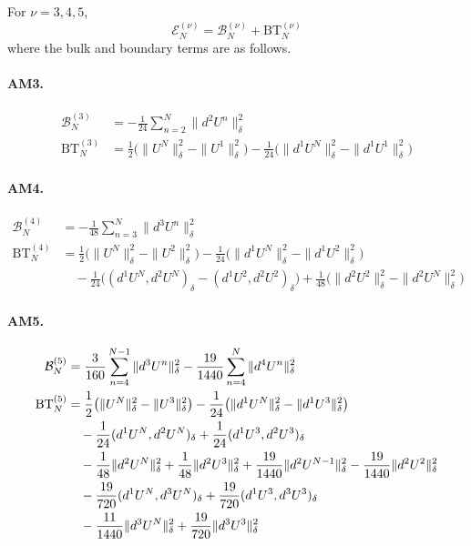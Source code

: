 \documentclass[11pt]{article}
\begin{document}
\begin{lem}
\label{lem:adams-exact-energy-decompositions}
For \(\nu=3,4,5\),
\begin{equation}
\mathcal E_N^{(\nu)}=\mathcal B_N^{(\nu)}+\mathrm{BT}_N^{(\nu)} \label{eq:adams-bulk-boundary-decomposition}
\end{equation}
where the bulk and boundary terms are as follows.

\paragraph{AM3.}
\begin{align}
\mathcal B_N^{(3)}
&=-\frac1{24}\sum_{n=2}^N\|d^2U^n\|_{\delta}^2 \label{eq:am3-energy-bulk}\\
\mathrm{BT}_N^{(3)}
&=\frac12\bigl(\|U^N\|_{\delta}^2-\|U^1\|_{\delta}^2\bigr)
-\frac1{24}\bigl(\|d^1U^N\|_{\delta}^2
-\|d^1U^1\|_{\delta}^2\bigr) \label{eq:am3-energy-boundary}
\end{align}

\paragraph{AM4.}
\begin{align}
\mathcal B_N^{(4)}
&=-\frac1{48}\sum_{n=3}^N\|d^3U^n\|_{\delta}^2 \label{eq:am4-energy-bulk}\\
\mathrm{BT}_N^{(4)}
&=\frac12\bigl(\|U^N\|_{\delta}^2-\|U^2\|_{\delta}^2\bigr)
-\frac1{24}\bigl(\|d^1U^N\|_{\delta}^2
-\|d^1U^2\|_{\delta}^2\bigr) \label{eq:am4-energy-boundary-main}\\
&\quad-\frac1{24}\bigl((d^1U^N,d^2U^N)_{\delta}
-(d^1U^2,d^2U^2)_{\delta}\bigr)
+\frac1{48}\bigl(\|d^2U^2\|_{\delta}^2
-\|d^2U^N\|_{\delta}^2\bigr) \label{eq:am4-energy-boundary-increments}
\end{align}

\paragraph{AM5.}
\begin{align}
\mathcal B_N^{(5)}
&=\frac3{160}\sum_{n=4}^{N-1}\|d^3U^n\|_{\delta}^2
-\frac{19}{1440}\sum_{n=4}^{N}\|d^4U^n\|_{\delta}^2 \label{eq:am5-energy-bulk}\\
\mathrm{BT}_N^{(5)}
&=\frac12\bigl(\|U^N\|_{\delta}^2-\|U^3\|_{\delta}^2\bigr)
-\frac1{24}\bigl(\|d^1U^N\|_{\delta}^2
-\|d^1U^3\|_{\delta}^2\bigr) \label{eq:am5-energy-boundary-main}\\
&\quad-\frac1{24}(d^1U^N,d^2U^N)_{\delta}
+\frac1{24}(d^1U^3,d^2U^3)_{\delta} \notag\\
&\quad-\frac1{48}\|d^2U^N\|_{\delta}^2
+\frac1{48}\|d^2U^3\|_{\delta}^2
+\frac{19}{1440}\|d^2U^{N-1}\|_{\delta}^2
-\frac{19}{1440}\|d^2U^2\|_{\delta}^2 \notag\\
&\quad-\frac{19}{720}(d^1U^N,d^3U^N)_{\delta}
+\frac{19}{720}(d^1U^3,d^3U^3)_{\delta} \notag\\
&\quad-\frac{11}{1440}\|d^3U^N\|_{\delta}^2
+\frac{19}{720}\|d^3U^3\|_{\delta}^2 \label{eq:am5-energy-boundary-increments}
\end{align}
\end{lem}
\end{document}
